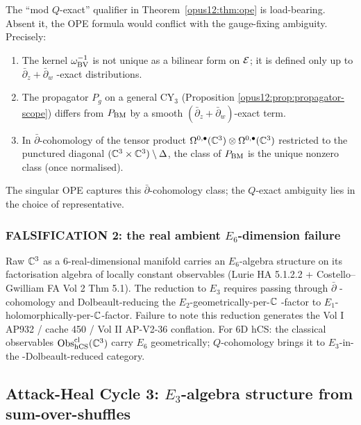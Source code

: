 \begin{proposition}\ClaimStatusProposition
\label{opus12:prop:q-exact-scope}
The ``mod $Q$-exact'' qualifier in Theorem~\ref{opus12:thm:ope} is
load-bearing. Absent it, the OPE formula would conflict with the
gauge-fixing ambiguity. Precisely:
\begin{enumerate}
\item The kernel $\omega^{-1}_{\mathrm{BV}}$ is not unique as a bilinear form
on $\mathcal{E}$; it is defined only up to $\bar\partial_z + \bar\partial_w$
-exact distributions.
\item The propagator $P_g$ on a general CY$_3$ (Proposition
\ref{opus12:prop:propagator-scope}) differs from $P_{\mathrm{BM}}$ by a
smooth $(\bar\partial_z + \bar\partial_w)$-exact term.
\item In $\bar\partial$-cohomology of the tensor product
$\Omega^{0,\bullet}(\mathbb{C}^3) \otimes \Omega^{0,\bullet}(\mathbb{C}^3)$
restricted to the punctured diagonal
$(\mathbb{C}^3 \times \mathbb{C}^3) \setminus \Delta$, the class of $P_{\mathrm{BM}}$ is
the unique nonzero class (once normalised).
\end{enumerate}
The singular OPE captures this $\bar\partial$-cohomology class; the
$Q$-exact ambiguity lies in the choice of representative.
\end{proposition}

\subsubsection{FALSIFICATION 2: the real ambient $E_6$-dimension failure}

\begin{proposition}
\label{opus12:prop:falsify-e3-native}
Raw $\mathbb{C}^3$ as a 6-real-dimensional manifold carries an $E_6$-algebra
structure on its factorisation algebra of locally constant
observables (Lurie HA 5.1.2.2 + Costello--Gwilliam FA Vol 2 Thm 5.1).
The reduction to $E_3$ requires passing through $\bar\partial$
-cohomology and Dolbeault-reducing the $E_2$-geometrically-per-$\mathbb{C}$
-factor to $E_1$-holomorphically-per-$\mathbb{C}$-factor. Failure to note
this reduction generates the Vol I AP932 / cache 450 / Vol II
AP-V2-36 conflation. For 6D hCS: the classical observables
$\mathrm{Obs}^{\mathrm{cl}}_{\mathrm{hCS}}(\mathbb{C}^3)$ carry
$E_6$ geometrically; $Q$-cohomology brings it to $E_3$-in-the
-Dolbeault-reduced category.
\end{proposition}

\subsection{Attack-Heal Cycle 3: $E_3$-algebra structure from sum-over-shuffles}
\label{opus12:sec:cycle3-shuffles}

